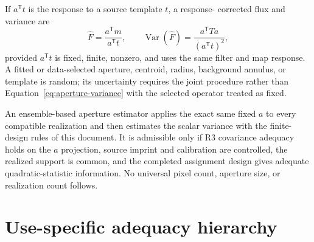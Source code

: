 \documentclass[11pt]{article}
\newcommand{\Var}{\operatorname{Var}}
\begin{document}
If $a^{\mathsf T}t$ is the response to a source template $t$, a response-
corrected flux and variance are
\begin{equation}
  \widehat F=\frac{a^{\mathsf T}m}{a^{\mathsf T}t},
  \qquad
  \Var(\widehat F)
  =\frac{a^{\mathsf T}Ta}{(a^{\mathsf T}t)^2},
  \label{eq:response-corrected-aperture}
\end{equation}
provided $a^{\mathsf T}t$ is fixed, finite, nonzero, and uses the same filter
and map response.  A fitted or data-selected aperture, centroid, radius,
background annulus, or template is random; its uncertainty requires the joint
procedure rather than Equation~\eqref{eq:aperture-variance} with the selected
operator treated as fixed.

An ensemble-based aperture estimator applies the exact same fixed $a$ to
every compatible realization and then estimates the scalar variance with the
finite-design rules of this document.  It is admissible only if R3 covariance
adequacy holds on the $a$ projection, source imprint and calibration are
controlled, the realized support is common, and the completed assignment
design gives adequate quadratic-statistic information.  No universal pixel
count, aperture size, or realization count follows.

\section{Use-specific adequacy hierarchy}
\end{document}
